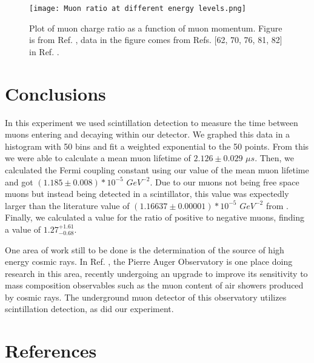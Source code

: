 \documentclass[11pt,letterpaper]{article}
\begin{document}
\begin{figure}
\centerline{\texttt{[image: Muon ratio at different energy levels.png]}}
\caption{Plot of muon charge ratio as a function of muon momentum. Figure is from Ref. \cite{Workman}, data in the figure comes from Refs. [62, 70, 76, 81, 82] in Ref. \cite{Workman}.}
\end{figure}
\label{Charge ratio}

\section{Conclusions}

In this experiment we used scintillation detection to measure the time between muons entering and decaying within our detector. We graphed this data in a histogram with 50 bins and fit a weighted exponential to the 50 points. From this we were able to calculate a mean muon lifetime of $2.126 \pm 0.029$ $\mu s$. Then, we calculated the Fermi coupling constant using our value of the mean muon lifetime and got $(1.185 \pm 0.008)*10^{-5}$ $GeV^{-2}$. Due to our muons not being free space muons but instead being detected in a scintillator, this value was expectedly larger than the literature value of $(1.16637 \pm 0.00001)*10^{-5}$ $GeV^{-2}$ from \cite{Balantekin}. Finally, we calculated a value for the ratio of positive to negative muons, finding a value of $1.27^{+1.61}_{-0.68}$.

One area of work still to be done is the determination of the source of high energy cosmic rays. In Ref. \cite{Scornavacce}, the Pierre Auger Observatory is one place doing research in this area, recently undergoing an upgrade to improve its sensitivity to mass composition observables such as the muon content of air showers produced by cosmic rays. The underground muon detector of this observatory utilizes scintillation detection, as did our experiment.


\section{References}
\end{document}
